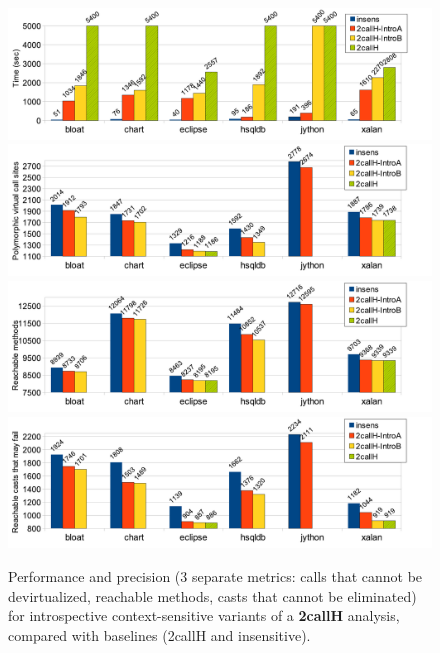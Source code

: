 \begin{figure}[t!bp]
\begin{center}
\includegraphics[scale=0.54]{assets/introspective/2callHtime.pdf} \\
\includegraphics[scale=0.54]{assets/introspective/2callHvcalls.pdf} \\
\includegraphics[scale=0.54]{assets/introspective/2callHmeths.pdf} \\
\includegraphics[scale=0.54]{assets/introspective/2callHcasts.pdf}
\end{center}
\caption[Performance and precision of introspective variants of a 2callH analysis]{Performance and precision (3 separate metrics: calls that cannot be devirtualized, reachable methods, casts that cannot be eliminated) for introspective context-sensitive variants of a \textbf{2callH} analysis, compared with baselines (2callH and insensitive).}
\label{fig:introspect:2callH-chart}
\end{figure}


